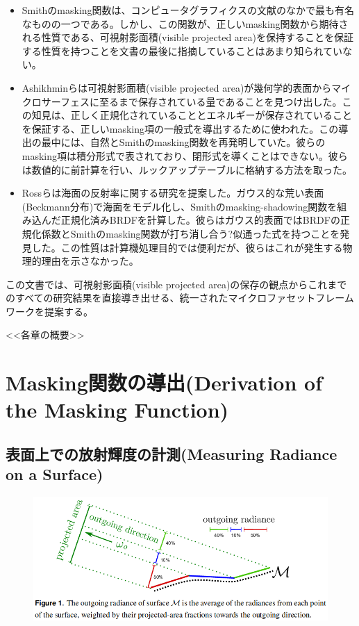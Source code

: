 \documentclass[a4paper,xelatex,ja=standard]{bxjsarticle}
\begin{document}
\begin{itemize}
\item Smithのmasking関数は、コンピュータグラフィクスの文献のなかで最も有名なものの一つである。しかし、この関数が、正しいmasking関数から期待される性質である、可視射影面積(visible projected area)を保持することを保証する性質を持つことを文書の最後に指摘していることはあまり知られていない。

\item Ashikhminらは可視射影面積(visible projected area)が幾何学的表面からマイクロサーフェスに至るまで保存されている量であることを見つけ出した。この知見は、正しく正規化されていることとエネルギーが保存されていることを保証する、正しいmasking項の一般式を導出するために使われた。この導出の最中には、自然とSmithのmasking関数を再発明していた。彼らのmasking項は積分形式で表されており、閉形式を導くことはできない。彼らは数値的に前計算を行い、ルックアップテーブルに格納する方法を取った。

\item Rossらは海面の反射率に関する研究を提案した。ガウス的な荒い表面(Beckmann分布)で海面をモデル化し、Smithのmasking-shadowing関数を組み込んだ正規化済みBRDFを計算した。彼らはガウス的表面ではBRDFの正規化係数とSmithのmasking関数が打ち消し合う?似通った式を持つことを発見した。この性質は計算機処理目的では便利だが、彼らはこれが発生する物理的理由を示さなかった。
\end{itemize}

この文書では、可視射影面積(visible projected area)の保存の観点からこれまでのすべての研究結果を直接導き出せる、統一されたマイクロファセットフレームワークを提案する。

<<各章の概要>>

\section{Masking関数の導出(Derivation of the Masking Function)}

\subsection{表面上での放射輝度の計測(Measuring Radiance on a Surface)}
\label{sec:2.1}

\begin{figure}
    \includegraphics[width=\textwidth]{Figure1.png}
    \caption{}
    \label{fig:1}
\end{figure}
\end{document}
